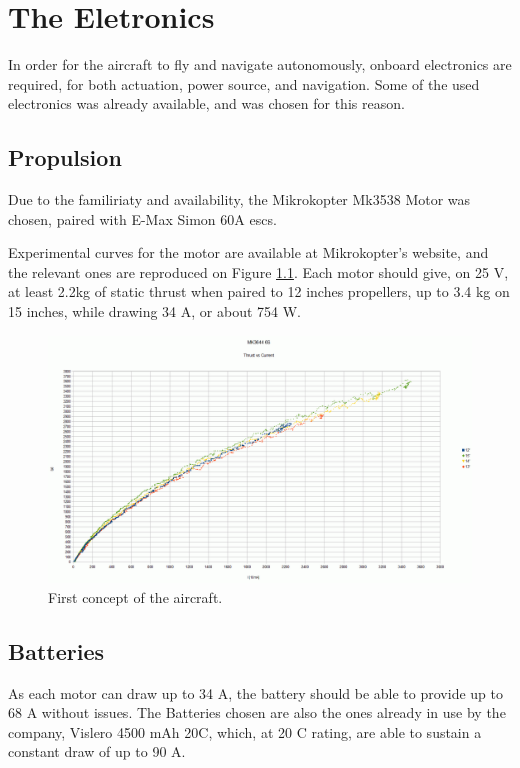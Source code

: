 
\chapter{The Eletronics} \label{chap:conc}

In order for the aircraft to fly and navigate autonomously, onboard electronics are required, for both actuation, power source, and navigation. Some of the used electronics was already available, and was chosen for this reason.
	
\section{Propulsion}

Due to the familiriaty and availability, the Mikrokopter Mk3538 Motor was chosen, paired with E-Max Simon 60A escs.

Experimental curves for the motor are available at Mikrokopter's website, and the relevant ones are reproduced on Figure \ref{fig:motorcurves}. Each motor should give, on 25 V, at least 2.2kg of static thrust when paired to 12 inches propellers, up to 3.4 kg on 15 inches, while drawing 34 A, or about 754 W.
\begin{figure}
\centering
  \includegraphics[width=\linewidth]{figs/motorcurves.png}
  \caption{First concept of the aircraft.}
  \label{fig:motorcurves}
\end{figure}


\section{Batteries}

As each motor can draw up to 34 A, the battery should be able to provide up to 68 A without issues.
The Batteries chosen are also the ones already in use by the company, Vislero 4500 mAh 20C, which, at 20 C rating, are able to sustain a constant draw of up to 90 A. 


